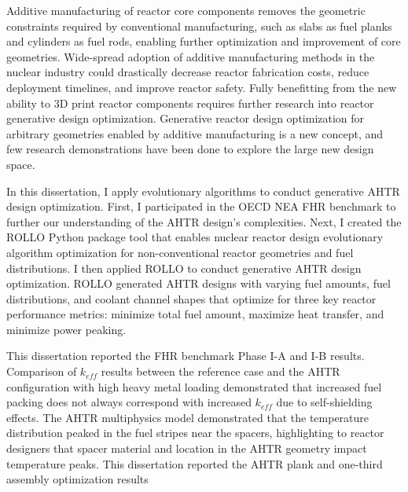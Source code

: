 
Additive manufacturing of reactor core components removes the geometric constraints
required by conventional manufacturing, such as slabs as fuel planks and cylinders 
as fuel rods, enabling further optimization and improvement of core geometries. 
Wide-spread adoption of additive manufacturing methods in the nuclear industry 
could drastically decrease reactor fabrication costs, reduce deployment timelines, 
and improve reactor safety. 
Fully benefitting from the new ability to 3D print reactor components requires further 
research into reactor generative design optimization. 
Generative reactor design optimization for arbitrary geometries enabled by additive 
manufacturing is a new concept, and few research demonstrations have been done to 
explore the large new design space. 

In this dissertation, I apply evolutionary algorithms to conduct generative \gls{AHTR} 
design optimization. 
First, I participated in the \gls{OECD} \gls{NEA} \gls{FHR} benchmark to further our 
understanding of the \gls{AHTR} design's complexities.  
Next, I created the \gls{ROLLO} Python package tool that enables nuclear reactor design 
evolutionary algorithm optimization for non-conventional reactor geometries and fuel 
distributions. 
I then applied \gls{ROLLO} to conduct generative \gls{AHTR} design optimization.
\gls{ROLLO} generated \gls{AHTR} designs with varying fuel amounts, fuel 
distributions, and coolant channel shapes that optimize for three key reactor 
performance metrics: minimize total fuel amount, maximize heat transfer, and 
minimize power peaking.

This dissertation reported the \gls{FHR} benchmark Phase I-A and I-B results. 
Comparison of $k_{eff}$ results between the reference case and the \gls{AHTR} 
configuration with high heavy metal loading demonstrated that increased fuel 
packing does not always correspond with increased $k_{eff}$ due to self-shielding 
effects.
The \gls{AHTR} multiphysics model demonstrated that the temperature distribution 
peaked in the fuel stripes near the spacers, highlighting to reactor designers that 
spacer material and location in the \gls{AHTR} geometry impact temperature peaks.  
This dissertation reported the \gls{AHTR} plank and one-third assembly optimization 
results 

